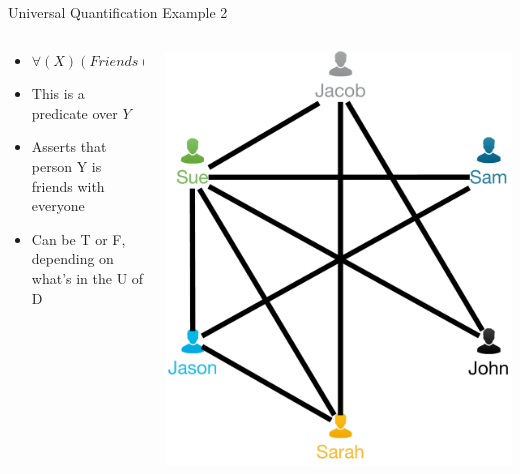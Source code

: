 \documentclass[aspectratio=169]{beamer}
\begin{document}
\begin{frame}{Universal Quantification Example 2}

\begin{columns}
\begin{column}{0.5\textwidth}
\begin{itemize}
\item $\forall(X)(Friends(X,Y))$
\item This is a predicate over $Y$
\item Asserts that person Y is friends with everyone
\item Can be T or F, depending on what's in the U of D
\end{itemize}
\end{column}
\begin{column}{0.5\textwidth}

{\centering\includegraphics[width=.8\textwidth]{./lectRDBMS/friendNetwork.pdf}\par}
\end{column}
\end{columns}
\end{frame}
\end{document}
